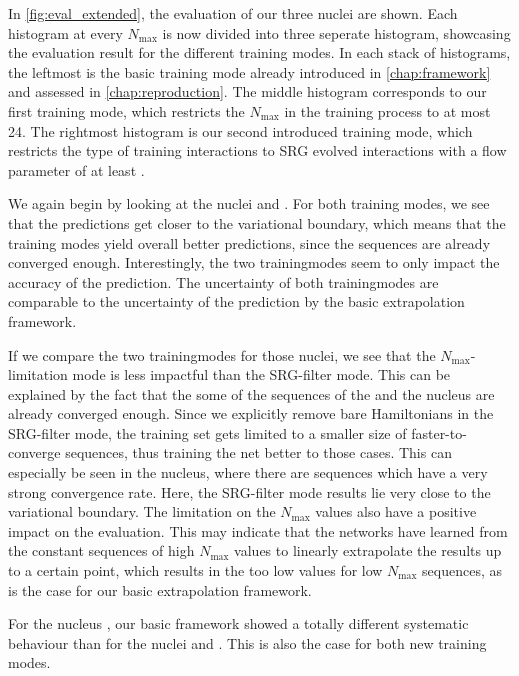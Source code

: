 In \autoref{fig:eval_extended}, the evaluation of our three nuclei are shown. Each histogram at every $N_\mathrm{max}$ is now divided into three seperate histogram, showcasing the evaluation result for the different training modes. In each stack of histograms, the leftmost is the basic training mode already introduced in \autoref{chap:framework} and assessed in \autoref{chap:reproduction}. The middle histogram corresponds to our first training mode, which restricts the $N_\mathrm{max}$ in the training process to at most 24. The rightmost histogram is our second introduced training mode, which restricts the type of training interactions to SRG evolved interactions with a flow parameter of at least .

We again begin by looking at the nuclei  and . For both training modes, we see that the predictions get closer to the variational boundary, which means that the training modes yield overall better predictions, since the sequences are already converged enough. Interestingly, the two trainingmodes seem to only impact the accuracy of the prediction. The uncertainty of both trainingmodes are comparable to the uncertainty of the prediction by the basic extrapolation framework.

If we compare the two trainingmodes for those nuclei, we see that the $N_\mathrm{max}$-limitation mode is less impactful than the SRG-filter mode. This can be explained by the fact that the some of the sequences of the  and the  nucleus are already converged enough. Since we explicitly remove bare Hamiltonians in the SRG-filter mode, the training set gets limited to a smaller size of faster-to-converge sequences, thus training the net better to those cases. This can especially be seen in the  nucleus, where there are sequences which have a very strong convergence rate. Here, the SRG-filter mode results lie very close to the variational boundary. The limitation on the $N_\mathrm{max}$ values also have a positive impact on the evaluation. This may indicate that the networks have learned from the constant sequences of high $N_\mathrm{max}$ values to linearly extrapolate the results up to a certain point, which results in the too low values for low $N_\mathrm{max}$ sequences, as is the case for our basic extrapolation framework.

For the nucleus , our basic framework showed a totally different systematic behaviour than for the nuclei  and . This is also the case for both new training modes.


